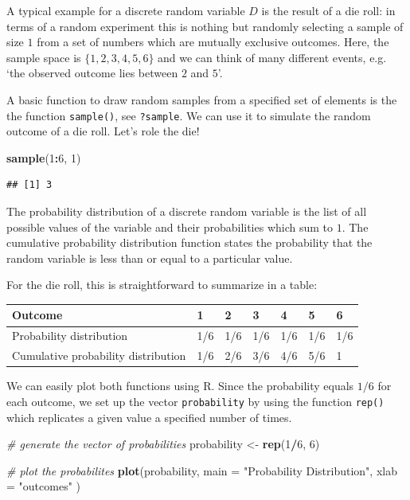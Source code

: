 \documentclass[]{book}
\newenvironment{Shaded}{\begin{snugshade}}{\end{snugshade}}
\newcommand{\KeywordTok}[1]{\textcolor[rgb]{0.13,0.29,0.53}{\textbf{#1}}}
\newcommand{\DataTypeTok}[1]{\textcolor[rgb]{0.13,0.29,0.53}{#1}}
\newcommand{\DecValTok}[1]{\textcolor[rgb]{0.00,0.00,0.81}{#1}}
\newcommand{\StringTok}[1]{\textcolor[rgb]{0.31,0.60,0.02}{#1}}
\newcommand{\CommentTok}[1]{\textcolor[rgb]{0.56,0.35,0.01}{\textit{#1}}}
\newcommand{\OperatorTok}[1]{\textcolor[rgb]{0.81,0.36,0.00}{\textbf{#1}}}
\newcommand{\NormalTok}[1]{#1}
\theoremstyle{definition}
\theoremstyle{definition}
\theoremstyle{definition}
\theoremstyle{remark}
\begin{document}
A typical example for a discrete random variable \(D\) is the result of
a die roll: in terms of a random experiment this is nothing but randomly
selecting a sample of size \(1\) from a set of numbers which are
mutually exclusive outcomes. Here, the sample space is
\(\{1,2,3,4,5,6\}\) and we can think of many different events, e.g. `the
observed outcome lies between \(2\) and \(5\)'.

A basic function to draw random samples from a specified set of elements
is the the function \texttt{sample()}, see \texttt{?sample}. We can use
it to simulate the random outcome of a die roll. Let's role the die!

\begin{Shaded}
\begin{Highlighting}[]
\KeywordTok{sample}\NormalTok{(}\DecValTok{1}\OperatorTok{:}\DecValTok{6}\NormalTok{, }\DecValTok{1}\NormalTok{) }
\end{Highlighting}
\end{Shaded}

\begin{verbatim}
## [1] 3
\end{verbatim}

The probability distribution of a discrete random variable is the list
of all possible values of the variable and their probabilities which sum
to \(1\). The cumulative probability distribution function states the
probability that the random variable is less than or equal to a
particular value.

For the die roll, this is straightforward to summarize in a table:

\begin{longtable}[]{@{}lllllll@{}}
\toprule
Outcome & 1 & 2 & 3 & 4 & 5 & 6\tabularnewline
\midrule
\endhead
Probability distribution & 1/6 & 1/6 & 1/6 & 1/6 & 1/6 &
1/6\tabularnewline
Cumulative probability distribution & 1/6 & 2/6 & 3/6 & 4/6 & 5/6 &
1\tabularnewline
\bottomrule
\end{longtable}

We can easily plot both functions using R. Since the probability equals
\(1/6\) for each outcome, we set up the vector \texttt{probability} by
using the function \texttt{rep()} which replicates a given value a
specified number of times.

\begin{Shaded}
\begin{Highlighting}[]
\CommentTok{# generate the vector of probabilities }
\NormalTok{probability <-}\StringTok{ }\KeywordTok{rep}\NormalTok{(}\DecValTok{1}\OperatorTok{/}\DecValTok{6}\NormalTok{, }\DecValTok{6}\NormalTok{) }

\CommentTok{# plot the probabilites }
\KeywordTok{plot}\NormalTok{(probability, }
     \DataTypeTok{main =} \StringTok{"Probability Distribution"}\NormalTok{,}
     \DataTypeTok{xlab =} \StringTok{"outcomes"} 
\NormalTok{     ) }
\end{Highlighting}
\end{Shaded}
\end{document}
